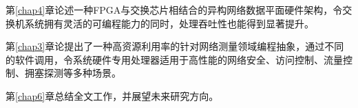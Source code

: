 第\ref{chap4}章论述一种FPGA与交换芯片相结合的异构网络数据平面硬件架构，令交换机系统拥有灵活的可编程能力的同时，处理吞吐性也能得到显著提升。

第\ref{chap3}章论提出了一种高资源利用率的针对网络测量领域编程抽象，通过不同的软件调用，令系统硬件专用处理器适用于高性能的网络安全、访问控制、流量控制、拥塞探测等多种场景。

第\ref{chap6}章总结全文工作，并展望未来研究方向。







































